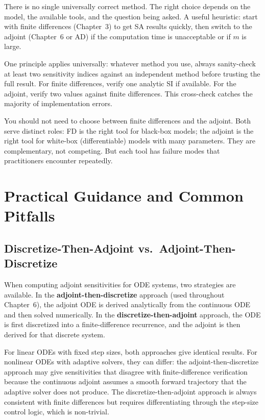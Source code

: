 There is no single universally correct method. The right choice depends
on the model, the available tools, and the question being asked.
A useful heuristic: start with finite differences (Chapter~3) to
get SA results quickly, then switch to the adjoint (Chapter~6 or
AD) if the computation time is unacceptable or if $m$ is large.

One principle applies universally: whatever method you use, always
sanity-check at least two sensitivity indices against an independent
method before trusting the full result. For finite differences,
verify one analytic SI if available. For the adjoint, verify two
values against finite differences. This cross-check catches the
majority of implementation errors.

You should not need to choose between finite differences and the adjoint.
Both serve distinct roles: FD is the right tool for black-box models;
the adjoint is the right tool for white-box (differentiable) models
with many parameters. They are complementary, not competing.
But each tool has failure modes that practitioners encounter repeatedly.

\section{Practical Guidance and Common Pitfalls}
\label{sec:pitfalls}

\subsection{Discretize-Then-Adjoint vs.\ Adjoint-Then-Discretize}

When computing adjoint sensitivities for ODE systems, two strategies
are available. In the \textbf{adjoint-then-discretize} approach
(used throughout Chapter~6), the adjoint ODE is derived analytically
from the continuous ODE and then solved numerically. In the
\textbf{discretize-then-adjoint} approach, the ODE is first
discretized into a finite-difference recurrence, and the adjoint
is then derived for that discrete system.

For linear ODEs with fixed step sizes, both approaches give identical
results. For nonlinear ODEs with adaptive solvers, they can differ:
the adjoint-then-discretize approach may give sensitivities that
disagree with finite-difference verification because the continuous
adjoint assumes a smooth forward trajectory that the adaptive solver
does not produce. The discretize-then-adjoint approach is always
consistent with finite differences but requires differentiating
through the step-size control logic, which is non-trivial.


